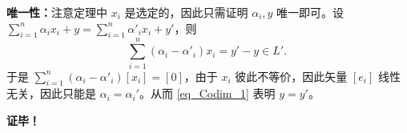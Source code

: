 \textbf{唯一性：}注意定理中 $x_i$ 是选定的，因此只需证明 $\alpha_i,y$ 唯一即可。设 $\sum\limits_{i=1}^n\alpha_i x_i+y=\sum\limits_{i=1}^n\alpha'_i x_i+y'$，则
\begin{equation}\label{eq_Codim_1}
\sum_{i=1}^n(\alpha_i -\alpha'_i) x_i=y'-y\in L'.~
\end{equation}
于是 $\sum_{i=1}^n(\alpha_i -\alpha'_i) [x_i]=[0]$，由于 $x_i$ 彼此不等价，因此矢量 $[e_i]$ 线性无关，因此只能是 $\alpha_i=\alpha_i'$。从而 \autoref{eq_Codim_1} 表明 $y=y'$。

\textbf{证毕！}

